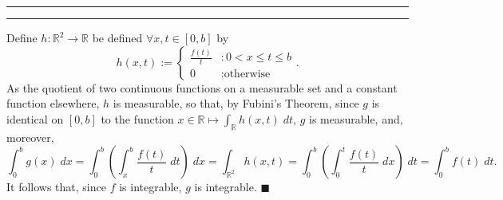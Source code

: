 \documentclass[11pt]{article}
\newcounter{questionCounter}
\newcounter{partCounter}[questionCounter]
\newenvironment{question}[2][\arabic{questionCounter}]{%
    \setcounter{partCounter}{0}%
    \vspace{.25in} \hrule \vspace{0.5em}%
        \noindent{\bf #2}%
    \vspace{0.8em} \hrule \vspace{.10in}%
    \addtocounter{questionCounter}{1}%
}{}
\renewcommand{\qed}{\quad $\blacksquare$}
\newcommand{\R}{\mathbb{R}} %
\begin{document}
\begin{question}{Exercise 4}
Define $h: \R^2 \rightarrow \R$ be defined $\forall x,t \in [0,b]$ by
\[
h(x,t)
 := \left\{
        \begin{array}{cl}
            \frac{f(t)}{t}  & : 0 < x \leq t \leq b \\
            0               & : \mbox{otherwise}
        \end{array}
    \right..
\]
As the quotient of two continuous functions on a measurable set and a constant
function elsewhere, $h$ is measurable, so that, by Fubini's Theorem, since $g$
is identical on $[0,b]$ to the function
$x \in \R \mapsto \int_{\R} h(x,t) \; dt$, $g$ is measurable, and, moreover,
\[
\int_0^b g(x) \; dx
   = \int_0^b \left( \int_x^b \frac{f(t)}{t} \; dt \right) \; dx
   = \int_{\R^2} h(x,t)
   = \int_0^b \left( \int_0^t \frac{f(t)}{t} \; dx \right) \; dt
   = \int_0^b f(t)\; dt.
\]
It follows that, since $f$ is integrable, $g$ is integrable. \qed
\end{question}
\end{document}
